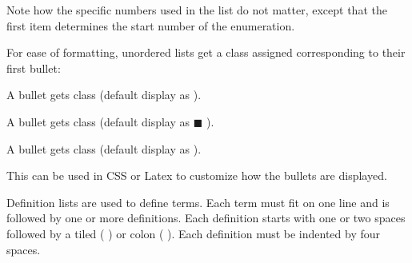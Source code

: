 \documentclass{book}
\begin{document}
\begin{mdP}[data-line={621}]%
{}Note how the specific numbers used in the list do not matter, except that
the first item determines the start number of the enumeration.%
\end{mdP}%
\begin{mdP}[class={indent,para-continue},data-line={624}]%
{}For ease of formatting, unordered lists get a class assigned corresponding
to their first bullet:%
\end{mdP}%
\begin{mdOl}[class={compact},data-line={627}]%
\begin{mdLi}[data-line={627}]%
{}A bullet %
{}\mdCode[class={code,code1}]{*}%
{} gets class %
{}%
{} (default display as %
{}{\textbullet}%
{}).%
\end{mdLi}%
\begin{mdLi}[data-line={628}]%
{}A bullet %
{}\mdCode[class={code,code1}]{+}%
{} gets class %
{}%
{} (default display as %
{}\ensuremath{\blacksquare}%
{}).%
\end{mdLi}%
\begin{mdLi}[data-line={629}]%
{}A bullet %
{}\mdCode[class={code,code1}]{-}%
{} gets class %
{}%
{} (default display as %
{}{\textendash}%
{}).%
\end{mdLi}%
\end{mdOl}%
\begin{mdP}[data-line={631}]%
{}This can be used in CSS or Latex to customize how the bullets 
are displayed.%
\end{mdP}%
\begin{mdP}[data-line={636}]%
{}Definition lists are used to define terms. Each term must fit on 
one line and is followed by one or more definitions. Each definition
starts with one or two spaces followed by a tiled (%
{}\mdCode[class={code,code1}]{{\textasciitilde}}%
{}) or colon (%
{}\mdCode[class={code,code1}]{:}%
{}).
Each definition must be indented by four spaces.%
\end{mdP}%
\end{document}
